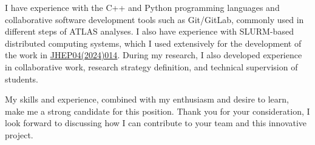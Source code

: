 \documentclass[11pt, a4paper]{awesome-cv}
\begin{document}
\begin{cvletter}
I have experience with the C++ and Python programming languages and collaborative software development tools such as Git/GitLab, commonly used in different steps of ATLAS analyses. I also have experience with SLURM-based distributed computing systems, which I used extensively for the development of the work in \href{http://dx.doi.org/10.1007/JHEP04(2024)014}{JHEP04(2024)014}. During my research, I also developed experience in collaborative work, research strategy definition, and technical supervision of students.

My skills and experience, combined with my enthusiasm and desire to learn, make me a strong candidate for this position. Thank you for your consideration, I look forward to discussing how I can contribute to your team and this innovative project.

\end{cvletter}


\makeletterclosing
\end{document}
